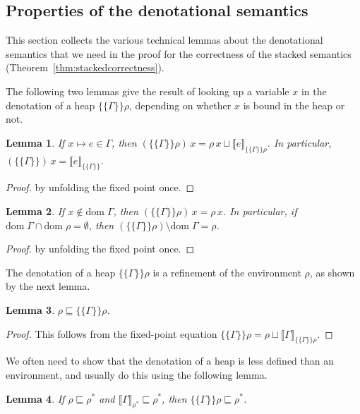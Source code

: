 \documentclass{scrartcl}
\newtheorem{lemma}{Lemma}
\theoremstyle{nonumberbreak}
\newtheorem{proof}{Proof}
\newcommand{\dom}[1]{\text{dom}\;#1}
\newcommand{\dsem}[2]{\llbracket #1 \rrbracket_{#2}}
\newcommand{\esem}[1]{\{\!\!\!\{#1\}\!\!\!\}}
\begin{document}
\subsection{Properties of the denotational semantics}
\label{sec:denprops}

This section collects the various technical lemmas about the denotational semantics that we need in the proof for the correctness of the stacked semantics (Theorem~\ref{thm:stackedcorrectness}).

The following two lemmas give the result of looking up a variable $x$ in the denotation of a heap $\esem\Gamma\rho$, depending on whether $x$ is bound in the heap or not. 

\begin{lemma}
\label{lem:esem_this}
If $x \mapsto e \in \Gamma$, then $(\esem{\Gamma}\rho)\, x = \rho\, x \sqcup \dsem{e}{\esem{\Gamma}\rho}$. In particular, $(\esem{\Gamma})\, x = \dsem{e}{\esem{\Gamma}}$.
\end{lemma}

\begin{proof}
by unfolding the fixed point once.
\end{proof}

\begin{lemma}
\label{lem:esem_other}%
\label{lem:remove}
If $x \notin \dom \Gamma$, then $(\esem{\Gamma}\rho)\, x = \rho\, x$.
In particular, if $\dom \Gamma \cap \dom \rho = \emptyset$, then $(\esem{\Gamma}\rho) \setminus \dom\Gamma = \rho$.
\end{lemma}

\begin{proof}
by unfolding the fixed point once.
\end{proof}

The denotation of a heap $\esem\Gamma\rho$ is a refinement of the environment $\rho$, as shown by the next lemma.

\begin{lemma}
$\rho \sqsubseteq \esem{\Gamma}{\rho}$.
\label{lem:rho_below_esem}
\end{lemma}

\begin{proof}
This follows from the fixed-point equation $\esem{\Gamma}{\rho} = \rho \sqcup \dsem{\Gamma}{\esem{\Gamma}{\rho}}$.
\end{proof}

We often need to show that the denotation of a heap is less defined than an environment, and usually do this using the following lemma.
\begin{lemma}
If $\rho \sqsubseteq \rho^*$ and $\dsem{\Gamma}{\rho^*} \sqsubseteq \rho^*$, then $\esem{\Gamma}\rho \sqsubseteq \rho^*$.
\label{lem:esem_below}
\end{lemma}
\end{document}
